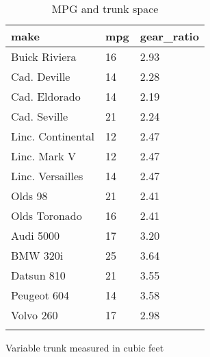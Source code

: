 \documentclass{article}
\begin{document}
\begin{table}[tbp] \centering
{}

\caption{MPG and trunk space}
\begin{tabularx}{\linewidth}{@{}lCC@{}}

\toprule
{make}&{mpg}&{gear\_ratio} \tabularnewline
\midrule \addlinespace[\belowrulesep]
Buick Riviera&16&2.93 \tabularnewline
Cad. Deville&14&2.28 \tabularnewline
Cad. Eldorado&14&2.19 \tabularnewline
Cad. Seville&21&2.24 \tabularnewline
Linc. Continental&12&2.47 \tabularnewline
Linc. Mark V&12&2.47 \tabularnewline
Linc. Versailles&14&2.47 \tabularnewline
Olds 98&21&2.41 \tabularnewline
Olds Toronado&16&2.41 \tabularnewline
Audi 5000&17&3.20 \tabularnewline
BMW 320i&25&3.64 \tabularnewline
Datsun 810&21&3.55 \tabularnewline
Peugeot 604&14&3.58 \tabularnewline
Volvo 260&17&2.98 \tabularnewline
\bottomrule \addlinespace[\belowrulesep]

\end{tabularx}
\parbox{\linewidth}{\footnotesize Variable trunk measured in cubic feet}
\end{table}
\end{document}

